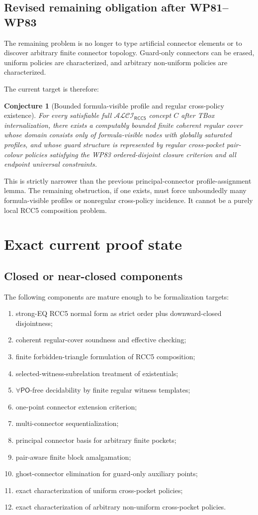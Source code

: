 \documentclass[11pt]{article}
\newtheorem{conjecture}[theorem]{Conjecture}
\newcommand{\PO}{\mathsf{PO}}
\newcommand{\ALCI}{\mathcal{ALCI}_{\mathsf{RCC5}}}
\begin{document}
\subsection{Revised remaining obligation after WP81--WP83}
The remaining problem is no longer to type artificial connector elements or to discover arbitrary finite connector topology.  Guard-only connectors can be erased, uniform policies are characterized, and arbitrary non-uniform policies are characterized.

The current target is therefore:
\begin{conjecture}[Bounded formula-visible profile and regular cross-policy existence]
For every satisfiable full $\ALCI$ concept $C$ after TBox internalization, there exists a computably bounded finite coherent regular cover whose domain consists only of formula-visible nodes with globally saturated profiles, and whose guard structure is represented by regular cross-pocket pair-colour policies satisfying the WP83 ordered-disjoint closure criterion and all endpoint universal constraints.
\end{conjecture}

This is strictly narrower than the previous principal-connector profile-assignment lemma.  The remaining obstruction, if one exists, must force unboundedly many formula-visible profiles or nonregular cross-policy incidence.  It cannot be a purely local RCC5 composition problem.


\section{Exact current proof state}

\subsection{Closed or near-closed components}
The following components are mature enough to be formalization targets:
\begin{enumerate}
\item strong-EQ RCC5 normal form as strict order plus downward-closed disjointness;
\item coherent regular-cover soundness and effective checking;
\item finite forbidden-triangle formulation of RCC5 composition;
\item selected-witness-subrelation treatment of existentials;
\item $\forall\PO$-free decidability by finite regular witness templates;
\item one-point connector extension criterion;
\item multi-connector sequentialization;
\item principal connector basis for arbitrary finite pockets;
\item pair-aware finite block amalgamation;
\item ghost-connector elimination for guard-only auxiliary points;
\item exact characterization of uniform cross-pocket policies;
\item exact characterization of arbitrary non-uniform cross-pocket policies.
\end{enumerate}
\end{document}
